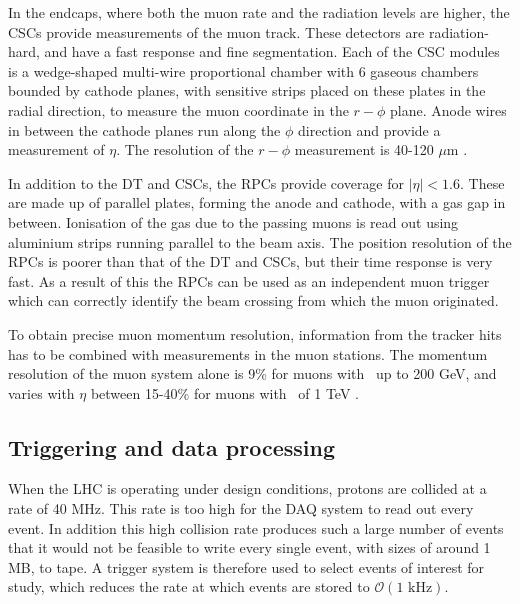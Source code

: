 In the endcaps, where both the muon rate and the radiation levels are higher, the \ac{CSCs} provide
measurements of the muon track. These detectors are radiation-hard,
and have a fast response and fine segmentation.
Each of the CSC modules is a wedge-shaped
multi-wire proportional chamber %
with 6 gaseous chambers bounded by cathode planes, with
sensitive strips placed on these plates in the
radial direction, to measure the muon coordinate in the  $r-\phi$ plane.
Anode wires in between the cathode planes
run along the $\phi$ direction and provide a measurement of
$\eta$. The resolution of the $r-\phi$ measurement is 40-120 $\mu$m \cite{cms-muon-7tev}.

In addition to the \ac{DT} and \ac{CSCs}, the \ac{RPCs} provide coverage
for $|\eta|<1.6$. These are made up of parallel plates, forming the anode and cathode,
with a gas gap in between. Ionisation of the gas due to the passing
muons is read out using aluminium strips running parallel to the 
beam axis. The position resolution of the \ac{RPCs} is poorer than
that of the \ac{DT} and \ac{CSCs}, but their time response is very fast. As
a result of this the \ac{RPCs} can be used as an independent muon trigger
which can correctly identify the beam crossing from which the muon
originated.

To obtain precise muon momentum resolution, information from 
the tracker hits has to be combined with measurements in the
muon stations. The momentum resolution of the muon system
alone is 9\% for muons with \pT~up to 200 GeV, and varies with $\eta$ 
between 15-40\% for muons with \pT~of 1 TeV \cite{cms-jinst}. %



\subsection{Triggering and data processing}
\label{sec:CMSLHC_CMS_trigger}
When the \ac{LHC} is operating under design conditions, protons are collided at a rate
of 40 MHz. This rate is too high for the \ac{DAQ} system to read out every event. In
addition this high collision rate produces such a large number of events that it would
not be feasible to write every single event, with sizes of around 1 MB, to tape. A trigger
system is therefore used to select events of interest for study, which reduces the rate
at which events are stored to  $\mathcal{O}(1 \text{ kHz})$.

